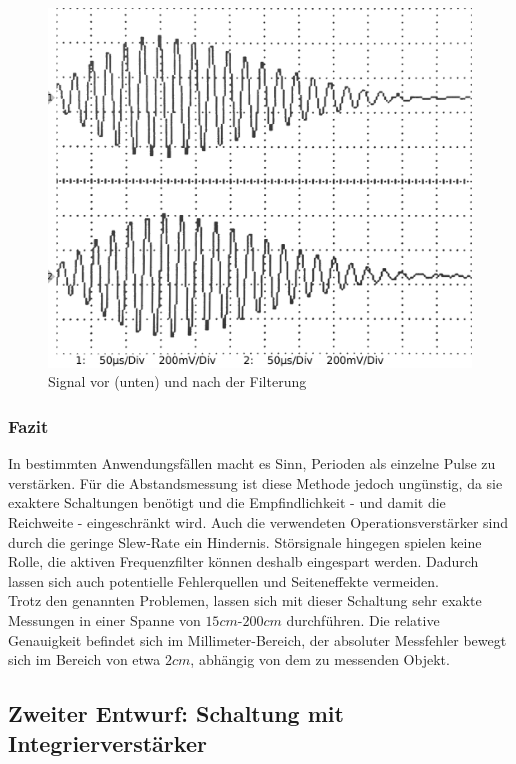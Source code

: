 \begin{figure}[H]
\centering
\includegraphics[width=(\textwidth), angle=0]{oszi/15-04-23/3_01.png}
\caption{Signal vor (unten) und nach der Filterung} \label{img:I10}
\end{figure}

\subsubsection{Fazit}
In bestimmten Anwendungsfällen macht es Sinn, Perioden als einzelne Pulse zu verstärken. Für die Abstandsmessung ist diese Methode jedoch ungünstig, da sie exaktere Schaltungen benötigt und die Empfindlichkeit - und damit die Reichweite - eingeschränkt wird. Auch die verwendeten Operationsverstärker sind durch die geringe Slew-Rate ein Hindernis. Störsignale hingegen spielen keine Rolle, die aktiven Frequenzfilter können deshalb eingespart werden. Dadurch lassen sich auch potentielle Fehlerquellen und Seiteneffekte vermeiden.\\
Trotz den genannten Problemen, lassen sich mit dieser Schaltung sehr exakte Messungen in einer Spanne von $15cm$-$200cm$ durchführen. Die relative Genauigkeit befindet sich im Millimeter-Bereich, der absoluter Messfehler bewegt sich im Bereich von etwa $2cm$, abhängig von dem zu messenden Objekt.



\subsection{Zweiter Entwurf: Schaltung mit Integrierverstärker} \label{schaltung:integrator}

